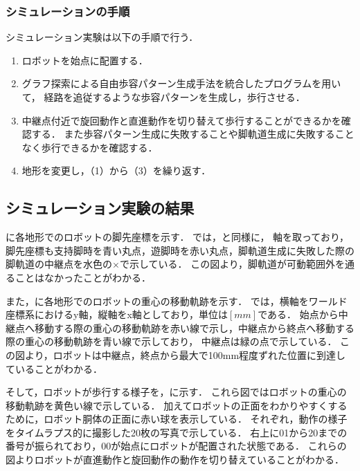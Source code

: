 \subsubsection{シミュレーションの手順}
シミュレーション実験は以下の手順で行う．

\begin{enumerate}
  \item ロボットを始点に配置する．
  \item グラフ探索による自由歩容パターン生成手法を統合したプログラムを用いて，
        経路を追従するような歩容パターンを生成し，歩行させる．
  \item 中継点付近で旋回動作と直進動作を切り替えて歩行することができるかを確認する．
  また歩容パターン生成に失敗することや脚軌道生成に失敗することなく歩行できるかを確認する．
  \item 地形を変更し，（1）から（3）を繰り返す．
\end{enumerate}


\subsection{シミュレーション実験の結果}
に各地形でのロボットの脚先座標を示す．
では，と同様に，
軸を取っており，脚先座標も支持脚時を青い丸点，遊脚時を赤い丸点，脚軌道生成に失敗した際の脚軌道の中継点を水色の$\times$で示している．
この図より，脚軌道が可動範囲外を通ることはなかったことがわかる．

また，に各地形でのロボットの重心の移動軌跡を示す．
では，横軸をワールド座標系におけるy軸，縦軸をx軸としており，単位は$[mm]$である．
始点から中継点へ移動する際の重心の移動軌跡を赤い線で示し，中継点から終点へ移動する際の重心の移動軌跡を青い線で示しており，
中継点は緑の点で示している．
この図より，ロボットは中継点，終点から最大で100mm程度ずれた位置に到達していることがわかる．


そして，ロボットが歩行する様子を，に示す．
これら図ではロボットの重心の移動軌跡を黄色い線で示している．
加えてロボットの正面をわかりやすくするために，ロボット胴体の正面に赤い球を表示している．
それぞれ，動作の様子をタイムラプス的に撮影した20枚の写真で示している．
右上に01から20までの番号が振られており，00が始点にロボットが配置された状態である．
これらの図よりロボットが直進動作と旋回動作の動作を切り替えていることがわかる．

